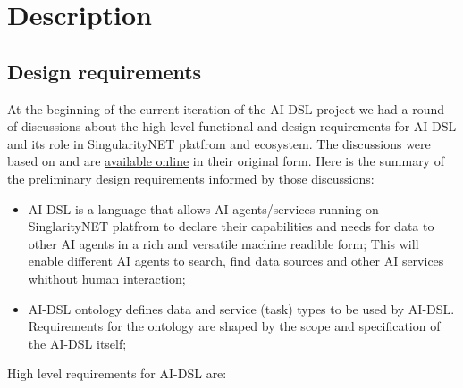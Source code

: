 \documentclass[]{report}
\begin{document}
\section{Description}

\subsection{Design requirements}

At the beginning of the current iteration of the AI-DSL project we had a round
of discussions about the high level functional and design requirements for
AI-DSL and its role in SingularityNET platfrom and ecosystem. The discussions
were based on
\cite{GoertzelGeisweillerBlog,singularitynet_foundation_phasetwo_2021}  and are
\href{https://github.com/nunet-io/ai-dsl-ontology/wiki/AI-DSL\%20requirements}{available
online} in their original form. Here is the summary of the preliminary design
requirements informed by those discussions:

\begin{itemize} \item AI-DSL is a language that allows AI agents/services
running on SinglarityNET platfrom to declare their capabilities and needs for
data to other AI agents in a rich and versatile machine readible form; This will
enable different AI agents to search, find data sources and other AI services
whithout human interaction; \item AI-DSL ontology defines data and service
(task) types to be used by AI-DSL. Requirements for the ontology are shaped by
the scope and specification of the AI-DSL itself; \end{itemize}

High level requirements for AI-DSL are:
\end{document}
